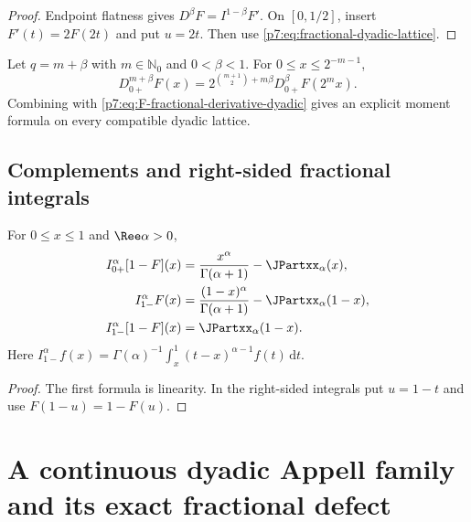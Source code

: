 \documentclass[11pt,oneside]{article}
\theoremstyle{definition}
\theoremstyle{remark}
\newcommand{\N}{\mathbb N}
\newcommand{\dd}{\,\mathrm d}
\newcommand{\1}{\mathbf 1}
\begin{document}
\begin{proof}
Endpoint flatness gives $D^\beta F=I^{1-\beta}F'$.  On $[0,1/2]$, insert
$F'(t)=2F(2t)$ and put $u=2t$.  Then use \cref{p7:eq:fractional-dyadic-lattice}.
\end{proof}

\begin{corollary}
\label{p7:cor:mixed-fractional-derivative}
Let $q=m+\beta$ with $m\in\N_0$ and $0<\beta<1$.  For
$0\le x\le2^{-m-1}$,
\begin{equation}
 D_{0+}^{m+\beta}F(x)
 =2^{\binom{m+1}{2}+m\beta}
 D_{0+}^{\beta}F(2^mx).
 \label{p7:eq:mixed-fractional-derivative}
\end{equation}
Combining with \cref{p7:eq:F-fractional-derivative-dyadic} gives an explicit moment formula on
every compatible dyadic lattice.
\end{corollary}

\subsection{Complements and right-sided fractional integrals}

\begin{proposition}
\label{p7:prop:fractional-complements}
For $0\le x\le1$ and $\Ree\alpha>0$,
\begin{align}
 I_{0+}^{\alpha}[1-F](x)
 &=\frac{x^\alpha}{\Gamma(\alpha+1)}-\JPartxx_\alpha(x),
 \label{p7:eq:fractional-complement-left}\\
 I_{1-}^{\alpha}F(x)
 &=\frac{(1-x)^\alpha}{\Gamma(\alpha+1)}-\JPartxx_\alpha(1-x),
 \label{p7:eq:fractional-right-F}\\
 I_{1-}^{\alpha}[1-F](x)
 &=\JPartxx_\alpha(1-x).
 \label{p7:eq:fractional-right-complement}
\end{align}
Here
$I_{1-}^{\alpha}f(x)=\Gamma(\alpha)^{-1}\int_x^1(t-x)^{\alpha-1}f(t)\dd t$.
\end{proposition}

\begin{proof}
The first formula is linearity.  In the right-sided integrals put $u=1-t$ and use
$F(1-u)=1-F(u)$.
\end{proof}

\section{A continuous dyadic Appell family and its exact fractional defect}
\label{p7:sec:Appell}
\end{document}
